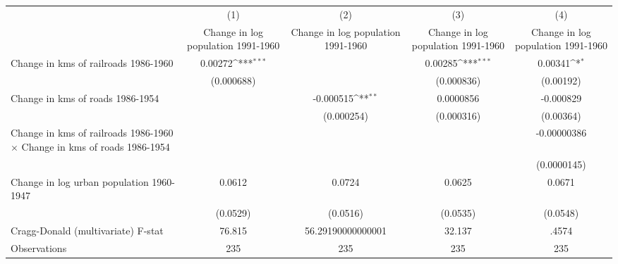 {
\def\sym#1{\ifmmode^{#1}\else\(^{#1}\)\fi}
\begin{tabular}{l*{4}{c}}
\hline\hline
                &\multicolumn{1}{c}{(1)}&\multicolumn{1}{c}{(2)}&\multicolumn{1}{c}{(3)}&\multicolumn{1}{c}{(4)}\\
                &\multicolumn{1}{c}{Change in log population 1991-1960}&\multicolumn{1}{c}{Change in log population 1991-1960}&\multicolumn{1}{c}{Change in log population 1991-1960}&\multicolumn{1}{c}{Change in log population 1991-1960}\\
\hline
Change in kms of railroads 1986-1960&  0.00272\sym{***}&                  &  0.00285\sym{***}&  0.00341\sym{*}  \\
                &(0.000688)         &                  &(0.000836)         &(0.00192)         \\
[1em]
Change in kms of roads 1986-1954&                  &-0.000515\sym{**} &0.0000856         &-0.000829         \\
                &                  &(0.000254)         &(0.000316)         &(0.00364)         \\
[1em]
Change in kms of railroads 1986-1960 $\times$ Change in kms of roads 1986-1954&                  &                  &                  &-0.00000386         \\
                &                  &                  &                  &(0.0000145)         \\
[1em]
Change in log urban population 1960-1947&   0.0612         &   0.0724         &   0.0625         &   0.0671         \\
                & (0.0529)         & (0.0516)         & (0.0535)         & (0.0548)         \\
\hline
Cragg-Donald (multivariate) F-stat&   76.815         &56.29190000000001         &   32.137         &    .4574         \\
Observations    &      235         &      235         &      235         &      235         \\
\hline\hline
\end{tabular}
}
